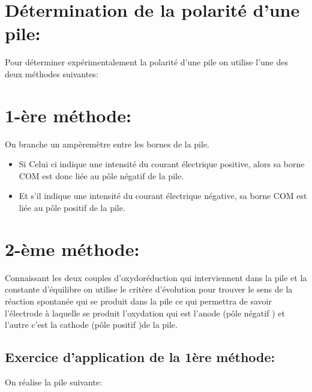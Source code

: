 \documentclass[12pt]{article}
\begin{document}
\section{Détermination de la polarité d'une pile: }

Pour déterminer expérimentalement la polarité d'une pile on utilise l'une des deux méthodes suivantes:

\section*{1-ère méthode:}
On branche un ampèremètre entre les bornes de la pile.
\begin{itemize}
	\item  Si Celui ci indique une intensité du courant électrique positive, alors sa borne COM est donc liée au pôle négatif de la pile.
	\item  Et s'il indique une intensité du courant électrique négative, sa borne COM est liée au pôle positif de la pile.
\end{itemize}


\section*{2-ème méthode:}

Connaissant les deux couples d'oxydoréduction qui interviennent dans la pile et la constante d'équilibre on utilise le critère
d'évolution pour trouver le sens de la réaction spontanée qui se produit dans la pile ce qui permettra de savoir l'électrode à
laquelle se produit l'oxydation qui est l'anode (pôle négatif ) et l'autre c'est la cathode (pôle positif )de la pile.


\subsection{Exercice d'application de la 1ère méthode: }

On réalise la pile suivante:
\end{document}
